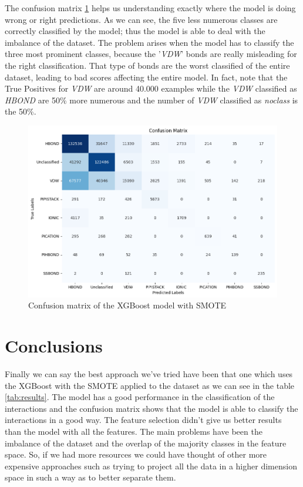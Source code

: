 \documentclass[10pt,twocolumn,letterpaper]{article}
\begin{document}
The confusion matrix \ref{fig:cmXGBoostSMOTE} helps us understanding exactly where the model is doing wrong or right 
predictions. As we can see, the five less numerous classes are correctly classified by the model; thus the model is able 
to deal with the imbalance of the dataset. The problem arises when the model has to classify the three most prominent 
classes, because the '\textit{VDW}' bonds are really misleading for the right classification. 
That type of bonds are the worst classified of the entire dataset, leading to bad scores affecting the entire model. 
In fact, note that the True Positives for \textit{VDW} are around 40.000 examples while the \textit{VDW} classified as \textit{HBOND} are 50\% more numerous and the number of \textit{VDW} classified as \textit{noclass} is the 50\%.
\begin{center}
    \begin{figure}[h!]
        \centering
        \includegraphics[scale=0.35]{img/cmXGBoostSMOTE.png}
        \caption{Confusion matrix of the XGBoost model with SMOTE}
        \label{fig:cmXGBoostSMOTE}
    \end{figure}
\end{center}

\section{Conclusions}
Finally we can say the best approach we've tried have been that one which uses the XGBoost 
with the SMOTE applied to the dataset as we can see in the table \ref{tab:results}. The model has a good performance in the classification of the 
interactions and the confusion matrix shows that the model is able to classify the interactions in a good way. 
The feature selection didn't give us better results than the model with all the features. 
The main problems have been the imbalance of the dataset and the overlap of the majority classes in the 
feature space. So, if we had more resources we could have thought of other more expensive approaches such as 
trying to project all the data in a higher dimension space in such a way as to better separate them.
{\small


}
\end{document}
